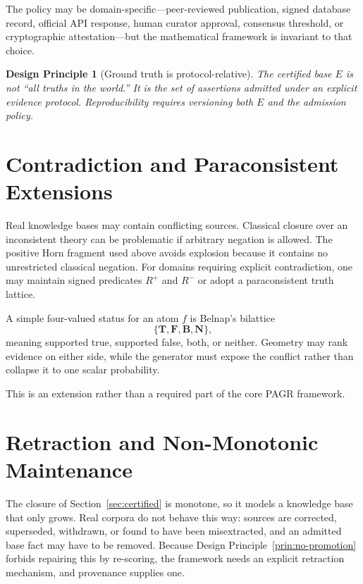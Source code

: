 \documentclass[11pt]{article}
\newtheorem{principle}[definition]{Design Principle}
\begin{document}
The policy may be domain-specific---peer-reviewed publication, signed database record, official API response, human curator approval, consensus threshold, or cryptographic attestation---but the mathematical framework is invariant to that choice.

\begin{principle}[Ground truth is protocol-relative]
\label{prin:protocol}
The certified base $E$ is not ``all truths in the world.'' It is the set of assertions admitted under an explicit evidence protocol. Reproducibility requires versioning both $E$ and the admission policy.
\end{principle}

\section{Contradiction and Paraconsistent Extensions}

Real knowledge bases may contain conflicting sources. Classical closure over an inconsistent theory can be problematic if arbitrary negation is allowed. The positive Horn fragment used above avoids explosion because it contains no unrestricted classical negation. For domains requiring explicit contradiction, one may maintain signed predicates $R^{+}$ and $R^{-}$ or adopt a paraconsistent truth lattice.

A simple four-valued status for an atom $f$ is Belnap's bilattice \citep{belnap1977}
\[
\{\mathbf{T},\mathbf{F},\mathbf{B},\mathbf{N}\},
\]
meaning supported true, supported false, both, or neither. Geometry may rank evidence on either side, while the generator must expose the conflict rather than collapse it to one scalar probability.

This is an extension rather than a required part of the core PAGR framework.

\section{Retraction and Non-Monotonic Maintenance}
\label{sec:retraction}

The closure of Section~\ref{sec:certified} is monotone, so it models a knowledge base that only grows. Real corpora do not behave this way: sources are corrected, superseded, withdrawn, or found to have been misextracted, and an admitted base fact may have to be removed. Because Design Principle~\ref{prin:no-promotion} forbids repairing this by re-scoring, the framework needs an explicit retraction mechanism, and provenance supplies one.
\end{document}
